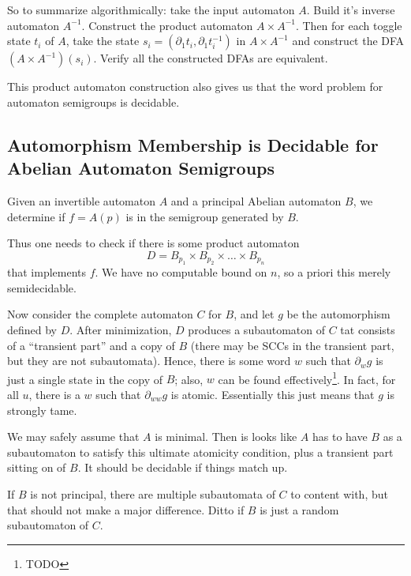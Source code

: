 \documentclass[11pt]{article}
\begin{document}
{So to summarize algorithmically: take the input automaton $A$. Build
it's inverse automaton $A^{-1}$. Construct the product automaton
$A\times A^{-1}$. Then for each toggle state $t_i$ of $A$, take the
state $s_i = (\partial_1 t_i, \partial_1 t_i^{-1})$ in
$A\times A^{-1}$ and construct the DFA $(A\times A^{-1})(s_i)$. Verify
all the constructed DFAs are equivalent.


This product automaton construction also gives us that the word
problem for automaton semigroups is decidable.
} %

\subsection{Automorphism Membership is Decidable for Abelian Automaton Semigroups}


{\color{TODO}
Given an invertible automaton $A$ and a principal Abelian automaton
$B$, we determine if $f = A(p)$ is in the semigroup generated by $B$.

Thus one needs to check if there is some product automaton
\[
  D = B_{p_1} \times B_{p_2} \times \ldots \times B_{p_n}
\]
that implements $f$. We have no computable bound on $n$, so a priori
this merely semidecidable.

Now consider the complete automaton $C$ for $B$, and let $g$ be the
automorphism defined by $D$. After minimization, $D$ produces a
subautomaton of $C$ tat consists of a ``transient part'' and a copy of
$B$ (there may be SCCs in the transient part, but they are not
subautomata). Hence, there is some word $w$ such that $\partial_w g$
is just a single state in the copy of $B$; also, $w$ can be found
effectively\footnote{TODO}. In fact, for all $u$, there is a $w$ such
that $\partial_{ww}g$ is atomic. Essentially this just means that $g$
is strongly tame.

We may safely assume that $A$ is minimal. Then is looks like $A$ has
to have $B$ as a subautomaton to satisfy this ultimate atomicity
condition, plus a transient part sitting on of $B$. It should be
decidable if things match up.

If $B$ is not principal, there are multiple subautomata of $C$ to
content with, but that should not make a major difference. Ditto if
$B$ is just a random subautomaton of $C$.

%
}
\end{document}

